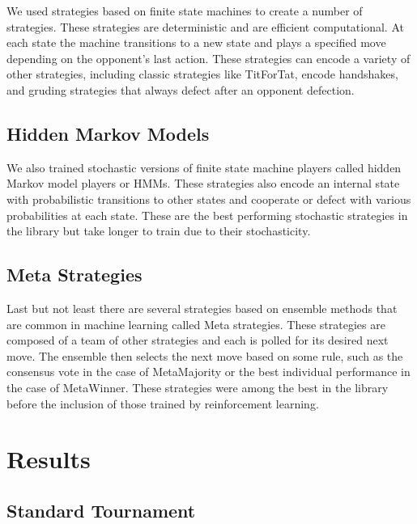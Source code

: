 \documentclass{article}
\begin{document}
We used strategies based on finite state machines to create a number of
strategies. These strategies are deterministic and are efficient computational.
At each state the machine transitions to a new state and plays a specified move
depending on the opponent's last action. These strategies can encode a variety
of other strategies, including classic strategies like TitForTat, encode
handshakes, and gruding strategies that always defect after an opponent
defection.



\subsection{Hidden Markov Models}

We also trained stochastic versions of finite state machine players called
hidden Markov model players or HMMs. These strategies also encode an internal
state with probabilistic transitions to other states and cooperate or defect
with various probabilities at each state. These are the best performing
stochastic strategies in the library but take longer to train due to their
stochasticity.


\subsection{Meta Strategies}

Last but not least there are several strategies based on ensemble methods that
are common in machine learning called Meta strategies. These strategies are
composed of a team of other strategies and each is polled for its desired next
move. The ensemble then selects the next move based on some rule, such as the
consensus vote in the case of MetaMajority or the best individual performance
in the case of MetaWinner. These strategies were among the best in the library
before the inclusion of those trained by reinforcement learning.


\section{Results}

\subsection{Standard Tournament}
\end{document}
